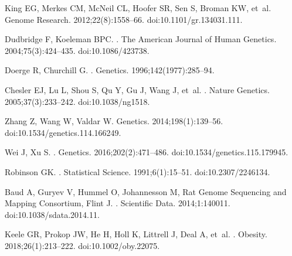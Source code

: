 \documentclass[10pt,letterpaper]{article}
\begin{document}
\begin{thebibliography}{10}
King EG, Merkes CM, McNeil CL, Hoofer SR, Sen S, Broman KW, et~al.
\newblock Genome Research. 2012;22(8):1558--66.
\newblock doi:{10.1101/gr.134031.111}.

Dudbridge F, Koeleman BPC.
.
\newblock The American Journal of Human Genetics. 2004;75(3):424--435.
\newblock doi:{10.1086/423738}.

Doerge R, Churchill G.
.
\newblock Genetics. 1996;142(1977):285--94.

Chesler EJ, Lu L, Shou S, Qu Y, Gu J, Wang J, et~al.
.
\newblock Nature Genetics. 2005;37(3):233--242.
\newblock doi:{10.1038/ng1518}.

Zhang Z, Wang W, Valdar W.
\newblock Genetics. 2014;198(1):139--56.
\newblock doi:{10.1534/genetics.114.166249}.

Wei J, Xu S.
.
\newblock Genetics. 2016;202(2):471--486.
\newblock doi:{10.1534/genetics.115.179945}.

Robinson GK.
.
\newblock Statistical Science. 1991;6(1):15--51.
\newblock doi:{10.2307/2246134}.

Baud A, Guryev V, Hummel O, Johannesson M, {Rat Genome Sequencing and Mapping
  Consortium}, Flint J.
.
\newblock Scientific Data. 2014;1:140011.
\newblock doi:{10.1038/sdata.2014.11}.

Keele GR, Prokop JW, He H, Holl K, Littrell J, Deal A, et~al.
.
\newblock Obesity. 2018;26(1):213--222.
\newblock doi:{10.1002/oby.22075}.


\end{thebibliography}
\end{document}
